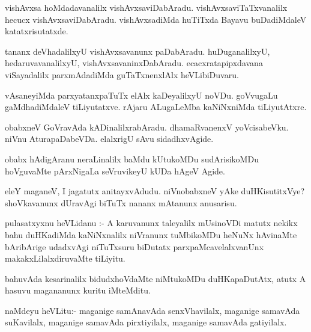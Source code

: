 \documentclass{article}
\begin{document}
\begin{mn}
vishAvxsa hoMdadavanalilx  vishAvxsaviDabAradu.  vishAvxsaviTaTxvanalilx  hecucx  
vishAvxsaviDabAradu.  vishAvxsadiMda  huTiTxda  Bayavu  buDadiMdaleV  katatxrisutatxde.
\end{mn}

\begin{mn}
tananx deVhadalilxyU  vishAvxsavanunx  paDabAradu.  huDuganalilxyU,  hedaruvavanalilxyU,  
vishAvxsavaninxDabAradu.  ecacxratapipxdavana  viSayadalilx  parxmAdadiMda  
guTaTxnenxlAlx  heVLibiDuvaru.
\end{mn}

\begin{mn}
vAsaneyiMda  parxyatanxpaTuTx  elAlx  kaDeyalilxyU  noVDu.  goVvugaLu  gaMdhadiMdaleV  
tiLiyutatxve.  rAjaru  ALugaLeMba  kaNiNxniMda  tiLiyutAtxre. 
\end{mn}

\begin{mn}
obabxneV  GoVravAda  kADinalilxrabAradu.  dhamaRvanenxV  yoVcisabeVku.  niVnu  AturapaDabeVDa.  
elalxrigU  sAvu  sidadhxvAgide.  
\end{mn}

\begin{mn}
obabx  hAdigAranu  neraLinalilx  baMdu  kUtukoMDu  sudArisikoMDu  hoVguvaMte  pArxNigaLa  
seVruvikeyU  kUDa  hAgeV  Agide.
\end{mn}

\begin{mn}
eleY  maganeV,  I  jagatutx  anitayxvAdudu.  niVnobabxneV  yAke  duHKisutitxVye?  shoVkavanunx  
dUravAgi  biTuTx  nananx  mAtanunx  anusarisu.  
\end{mn}

\begin{mn}
pulasatxyxnu  heVLidanu :- A  karuvanunx  taleyalilx  mUsinoVDi  matutx  nekikx  bahu  
duHKadiMda  kaNiNxnalilx  niVranunx  tuMbikoMDu  heNuNx hAvinaMte  bAribArige  udadxvAgi  
niTuTxsuru  biDutatx  parxpaMcavelalxvanUnx  makakxLilalxdiruvaMte  tiLiyitu.
\end{mn}

\begin{mn}
bahuvAda  kesarinalilx  bidudxhoVdaMte  niMtukoMDu  duHKapaDutAtx,  atutx  A hasuvu  
magananunx  kuritu  iMteMditu.
\end{mn}

\begin{mn}
naMdeyu  heVLitu:- maganige  samAnavAda  senxVhavilalx,  maganige  samavAda  suKavilalx,  
maganige samavAda  pirxtiyilalx,  maganige  samavAda  gatiyilalx.
\end{mn}
\end{document}
